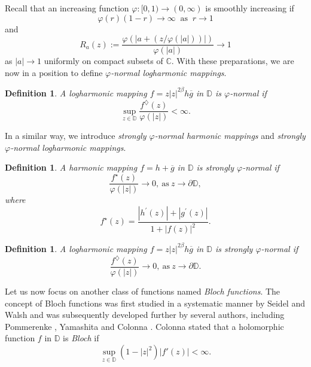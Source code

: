 \documentclass[10pt,a4paper]{amsart}
\newtheorem{definition}[theorem]{Definition}
\numberwithin{equation}{section}
\begin{document}
Recall that an increasing function $\varphi : [0, 1)\to (0,\infty)$ is smoothly increasing if
\begin{equation*}\varphi(r)(1-r)\to \infty\ \text{ as }\ r \to 1\end{equation*}
and
\begin{equation*}R_a(z) := \frac{\varphi(|a + (z/\varphi(|a|))|)}
{\varphi(|a|)}\to 1\end{equation*} as $|a|\to 1$ uniformly on compact subsets of $\mathbb C$. With 
these preparations, we are now in a position to 
define \emph{$\varphi$-normal logharmonic mappings}.
\begin{definition}
A logharmonic mapping $f=z|z|^{2\beta}h\overline{g}$ in $\mathbb{D}$ is
$\varphi$-\emph{normal} if \begin{equation*}
\sup_{z\in\mathbb{D}}\frac{f^\diamondsuit(z)}{\varphi(|z|)}<\infty.
\end{equation*}
\end{definition}
In a similar way, we introduce \emph{strongly $\varphi$-normal harmonic mappings} and \emph{strongly $\varphi$-normal logharmonic mappings}.
\begin{definition}
A harmonic mapping $f=h+\overline{g}$ in $\mathbb D$ is \emph{strongly} $\varphi$-\emph{normal} if
\begin{equation*}\frac{f^\star(z)}{\varphi(|z|)}\to 0,\ \text{as}\ z\to \partial\mathbb D,\end{equation*}
 where \begin{equation*}f^\star(z)=\dfrac{|h^\prime(z)|+|g^\prime(z)|}{1+|f(z)|^2}.\end{equation*}
\end{definition}
\begin{definition}
A logharmonic mapping $f=z|z|^{2\beta}h\overline{g}$ in $\mathbb D$ is \emph{strongly} $\varphi$-\emph{normal} if
\begin{equation*}\frac{f^\diamondsuit(z)}{\varphi(|z|)}\to 0,\ \text{as}\ z\to \partial\mathbb D.\end{equation*}
\end{definition}
\smallskip
 Let us now focus on another class of functions named \emph{Bloch functions}. The concept of Bloch 
 functions was first studied in a systematic manner by Seidel and Walsh \cite{seidel-otdofaitucatrouaopv-1942} and was subsequently developed further by 
 several authors, including Pommerenke \cite{pommerenke-obf-1970}, Yamashita \cite{yamashita-cfftbb-1980} and Colonna \cite{colonna-banfatr-1989}. Colonna stated that a holomorphic function $f$ in $\mathbb D$ is \emph{Bloch} if 
 \begin{equation*}
     \sup_{z\in\mathbb D}(1-|z|^2)|f'(z)|<\infty.
 \end{equation*}
 
\end{document}
